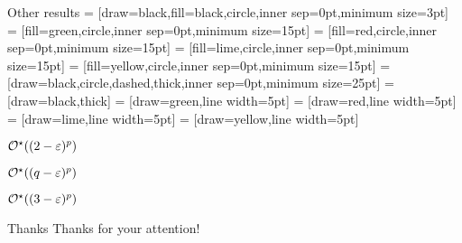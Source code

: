 \begin{frame}{Other results}
     = [draw=black,fill=black,circle,inner sep=0pt,minimum size=3pt]
     = [fill=green,circle,inner sep=0pt,minimum size=15pt]
     = [fill=red,circle,inner sep=0pt,minimum size=15pt]
     = [fill=lime,circle,inner sep=0pt,minimum size=15pt]
     = [fill=yellow,circle,inner sep=0pt,minimum size=15pt]
     = [draw=black,circle,dashed,thick,inner sep=0pt,minimum size=25pt]
     = [draw=black,thick]
     = [draw=green,line width=5pt]
     = [draw=red,line width=5pt]
     = [draw=lime,line width=5pt]
     = [draw=yellow,line width=5pt]

    \centering
    \begin{minipage}{.32\textwidth}
        \centering
        

        \vspace{.5cm}

        \IS

        $\mathcal{O}^\star((2 - \varepsilon)^p)$
    \end{minipage}
    \begin{minipage}{.32\textwidth}
        \centering
        
        
        \vspace{.5cm}


        $\mathcal{O}^\star((q - \varepsilon)^p)$
    \end{minipage}
    \begin{minipage}{.32\textwidth}
        \centering
        
        
        \vspace{.5cm}
        

        $\mathcal{O}^\star((3 - \varepsilon)^p)$
    \end{minipage}
\end{frame}

\begin{frame}{Thanks}
    \centering
    Thanks for your attention!
\end{frame}